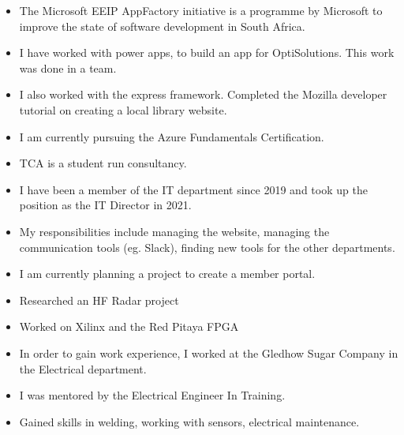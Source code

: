 \documentclass[10pt,a4paper,ragged2e,withhyper]{altacv}
\begin{document}
\begin{paracol}{2}


\begin{itemize}
\item The Microsoft EEIP AppFactory initiative is a programme by Microsoft to improve the state of software development in South Africa.
\item I have worked with power apps, to build an app for OptiSolutions. This work was done in a team. 
\item I also worked with the express framework. Completed the Mozilla developer tutorial on creating a local library website. 
\item I am currently pursuing the Azure Fundamentals Certification.
\end{itemize}

\divider
{}
\begin{itemize}
\item TCA is a student run consultancy. 
\item I have been a member of the IT department since 2019 and took up the position as the IT Director in 2021. 
\item My responsibilities include managing the website, managing the communication tools (eg. Slack), finding new tools for the other departments. 
\item I am currently planning a project to create a member portal. 
\end{itemize}

\divider

\begin{itemize}
\item Researched an HF Radar project
\item Worked on Xilinx and the Red Pitaya FPGA
\end{itemize}

\divider

\begin{itemize}
\item In order to gain work experience, I worked at the Gledhow Sugar Company in the Electrical department.
\item  I was mentored by the Electrical Engineer In Training.
\item Gained skills in welding, working with sensors, electrical maintenance. 
\end{itemize}


\end{paracol}
\end{document}
